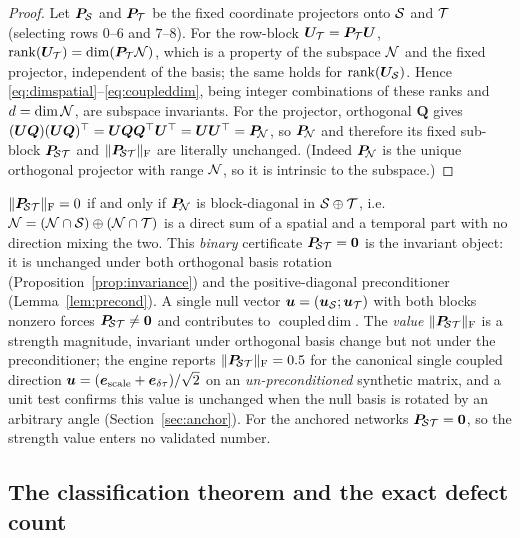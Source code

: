 \begin{proof}
Let $\bm P_{\mathcal{S}}$ and $\bm P_{\mathcal{T}}$ be the fixed coordinate projectors onto $\mathcal{S}$ and
$\mathcal{T}$ (selecting rows $0$--$6$ and $7$--$8$). For the row-block $\bm{U}_{\mathcal{T}}=\bm P_{\mathcal{T}}\bm{U}$,
$\operatorname{rank}(\bm{U}_{\mathcal{T}})=\dim(\bm P_{\mathcal{T}}\mathcal{N})$, which is a property of the subspace $\mathcal{N}$ and the
fixed projector, independent of the basis; the same holds for $\operatorname{rank}(\bm{U}_{\mathcal{S}})$. Hence
\eqref{eq:dimspatial}--\eqref{eq:coupleddim}, being integer combinations of these ranks and
$d=\dim\mathcal{N}$, are subspace invariants. For the projector, orthogonal $\bm Q$ gives
$(\bm{U}\bm Q)(\bm{U}\bm Q)^\top=\bm{U}\bm Q\bm Q^\top\bm{U}^\top=\bm{U}\bm{U}^\top=\bm{P}_{\!\mathcal{N}}$, so
$\bm{P}_{\!\mathcal{N}}$ and therefore its fixed sub-block $\bm{P}_{\!\mathcal{S}\mathcal{T}}$ and $\lVert\bm{P}_{\!\mathcal{S}\mathcal{T}}\rVert_{\mathrm F}$ are
literally unchanged. (Indeed $\bm{P}_{\!\mathcal{N}}$ is the unique orthogonal projector with range $\mathcal{N}$,
so it is intrinsic to the subspace.)
\end{proof}

\begin{remark}
\label{rem:projnorm}
$\lVert\bm{P}_{\!\mathcal{S}\mathcal{T}}\rVert_{\mathrm F}=0$ if and only if $\bm{P}_{\!\mathcal{N}}$ is block-diagonal in
$\mathcal{S}\oplus\mathcal{T}$, i.e.\ $\mathcal{N}=(\mathcal{N}\cap\mathcal{S})\oplus(\mathcal{N}\cap\mathcal{T})$ is a direct sum of a
spatial and a temporal part with no direction mixing the two. This \emph{binary} certificate
$\bm{P}_{\!\mathcal{S}\mathcal{T}}=\bm0$ is the invariant object: it is unchanged under both orthogonal basis rotation
(Proposition~\ref{prop:invariance}) and the positive-diagonal preconditioner
(Lemma~\ref{lem:precond}). A single null vector $\bm u=(\bm u_{\mathcal{S}};\bm u_{\mathcal{T}})$ with both
blocks nonzero forces $\bm{P}_{\!\mathcal{S}\mathcal{T}}\neq\bm0$ and contributes to $\operatorname{coupled\,dim}$. The
\emph{value} $\lVert\bm{P}_{\!\mathcal{S}\mathcal{T}}\rVert_{\mathrm F}$ is a strength magnitude, invariant under
orthogonal basis change but not under the preconditioner; the engine reports
$\lVert\bm{P}_{\!\mathcal{S}\mathcal{T}}\rVert_{\mathrm F}=0.5$ for the canonical single coupled direction
$\bm u=(\bm e_{\text{scale}}+\bm e_{\delta\tau})/\sqrt2$ on an \emph{un-preconditioned} synthetic
matrix, and a unit test confirms this value is unchanged when the null basis is rotated by an
arbitrary angle (Section~\ref{sec:anchor}). For the anchored networks $\bm{P}_{\!\mathcal{S}\mathcal{T}}=\bm0$, so the
strength value enters no validated number.
\end{remark}

\subsection{The classification theorem and the exact defect count}
\label{sec:classify}


